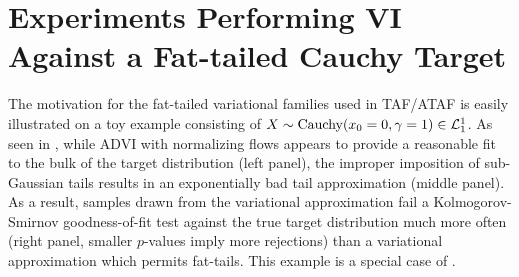 \documentclass[nohyperref]{article}
\theoremstyle{plain}
\theoremstyle{definition}
\theoremstyle{remark}
\begin{document}


\newpage
\appendix
\onecolumn

\section{Experiments Performing VI Against a Fat-tailed Cauchy Target}
\label{sec:cauchy_normal_student}
The motivation for the fat-tailed variational families used in TAF/ATAF
is easily illustrated on a toy example consisting of $X \sim \text{Cauchy}(x_0 = 0, \gamma = 1) \in \mathcal{L}^1_1$.
As seen in , while ADVI with normalizing flows \citep{kingma2016improved,webb2019improving}
appears to provide a reasonable fit to the bulk of the target distribution (left panel), the improper
imposition of sub-Gaussian tails results in an exponentially bad tail approximation (middle panel).
As a result, samples drawn from the variational approximation fail a Kolmogorov-Smirnov goodness-of-fit
test against the true target distribution much more often (right panel, smaller $p$-values imply more rejections)
than a variational approximation which permits fat-tails. This example is a special case of .
\end{document}
